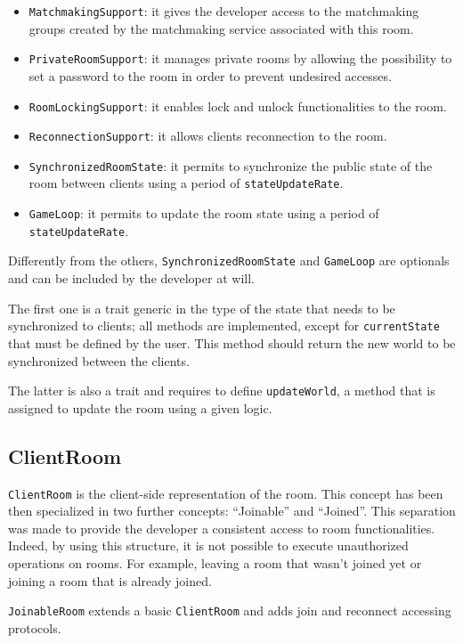 \begin{itemize}
    \item \texttt{MatchmakingSupport}: it gives the developer access to the matchmaking groups created by the matchmaking service associated with this room.
	\item \texttt{PrivateRoomSupport}: it manages private rooms by allowing the possibility to set a password to the room in order to prevent undesired accesses.
	\item \texttt{RoomLockingSupport}: it enables lock and unlock functionalities to the room.
	\item \texttt{ReconnectionSupport}: it allows clients reconnection to the room.
	\item \texttt{SynchronizedRoomState}: it permits to synchronize the public state of the room between clients using a period of \texttt{stateUpdateRate}.
	\item \texttt{GameLoop}: it permits to update the room state using a period of \texttt{stateUpdateRate}.
\end{itemize}

Differently from the others, \texttt{SynchronizedRoomState} and \texttt{GameLoop} are optionals and can be included by the developer at will.

The first one is a trait generic in the type of the state that needs to be synchronized to clients; all methods are implemented, except for \texttt{currentState} that must be defined by the user. This method should return the new world to be synchronized between the clients.

The latter is also a trait and requires to define \texttt{updateWorld}, a method that is assigned to update the room using a given logic.

\subsection{ClientRoom}

\texttt{ClientRoom} is the client-side representation of the room.
This concept has been then specialized in two further concepts: ``Joinable'' and ``Joined''.
This separation was made to provide the developer a consistent access to room functionalities. Indeed, by using this structure, it is not possible to execute unauthorized operations on rooms. For example, leaving a room that wasn't joined yet or joining a room that is already joined.

\bigskip
\texttt{JoinableRoom} extends a basic \texttt{ClientRoom} and adds join and reconnect accessing protocols.


